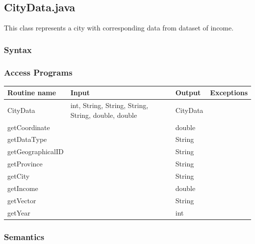\documentclass[12pt,fleqn]{article}
\begin{document}
\subsection*{CityData.java}\label{cityd}
This class represents a city with corresponding data from dataset of income.
\subsubsection* {Syntax}

\subsubsection* {Access Programs}
\begin{tabular}{| l | l | l | l |}
\hline
\textbf{Routine name} & \textbf{Input} & \textbf{Output} & \textbf{Exceptions}\\
\hline
CityData & int, String, String, String, String, double, double & CityData & ~\\
\hline
 getCoordinate& ~ & double & ~\\
\hline
getDataType & ~ & String & ~\\
\hline
getGeographicalID & ~ & String & ~\\
\hline
getProvince & ~ & String & ~\\
\hline
getCity & ~ & String & ~\\
\hline
getIncome & ~ & double & ~\\
\hline
getVector & ~ & String & ~\\
\hline
getYear & ~ & int & ~\\

\hline
\end{tabular}

\subsubsection*{Semantics}
\end{document}
